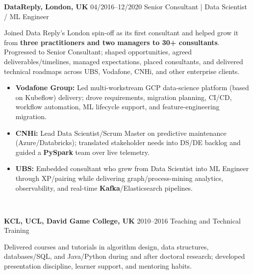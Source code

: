 \documentclass[]{../../friggeri-cv}
\renewcommand{\entry}[4]{%
  \parbox[t]{\dimexpr\textwidth-\entryleftinset\relax}{%
    \textbf{#2}%
    {\footnotesize\addfontfeature{Color=lightgray}\hspace{0.6em}#1}%
    \hfill%
    {\small\color{textcolor} #3}\\%
    #4\vspace{\parsep}%
  }\\}
\begin{document}
\begin{entrylist}
{\begin{itemize}[leftmargin=1.1em]
        \end{itemize}
    }
    \entry
    {04/2016--12/2020}
    {DataReply, London, UK}
    {Senior Consultant | Data Scientist / ML Engineer}
    {
        {\normalsize
        \setlength{\parindent}{0pt}
        \setlength{\leftskip}{0pt}
        Joined Data Reply's London spin-off as its first consultant and helped grow it from \textbf{three practitioners and two managers to 30+ consultants}. Progressed to Senior Consultant; shaped opportunities, agreed deliverables/timelines, managed expectations, placed consultants, and delivered technical roadmaps across UBS, Vodafone, CNHi, and other enterprise clients.

        }
        \begin{itemize}[leftmargin=1.1em]
            \item \normalsize\textbf{Vodafone Group:} Led multi-workstream GCP data-science platform (based on Kubeflow) delivery; drove requirements, migration planning, CI/CD, workflow automation, ML lifecycle support, and feature-engineering migration.
            \item \normalsize\textbf{CNHi:} Lead Data Scientist/Scrum Master on predictive maintenance (Azure/Databricks); translated stakeholder needs into DS/DE backlog and guided a \textbf{PySpark} team over live telemetry.
            \item \normalsize\textbf{UBS:} Embedded consultant who grew from Data Scientist into ML Engineer through XP/pairing while delivering graph/process-mining analytics, observability, and real-time \textbf{Kafka}/Elasticsearch pipelines.
        \end{itemize}
    }
    \entry
    {2010--2016}
    {KCL, UCL, David Game College, UK}
    {Teaching and Technical Training}
    {
        {\small
        \setlength{\parindent}{0pt}
        \setlength{\leftskip}{0pt}
        Delivered courses and tutorials in algorithm design, data structures, databases/SQL, and Java/Python during and after doctoral research; developed presentation discipline, learner support, and mentoring habits.

        }
    }
\end{entrylist}
\newpage
\setlength{\parskip}{2pt}
\setlength{\parsep}{0pt}
\end{document}
